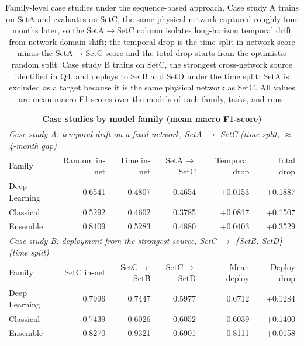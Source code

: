 \begin{table}[htbp]
\caption{Family-level case studies under the sequence-based approach. Case study A trains on SetA and evaluates on SetC, the same physical network captured roughly four months later, so the SetA$\to$SetC column isolates long-horizon temporal drift from network-domain shift; the temporal drop is the time-split in-network score minus the SetA$\to$SetC score and the total drop starts from the optimistic random split. Case study B trains on SetC, the strongest cross-network source identified in Q4, and deploys to SetB and SetD under the time split; SetA is excluded as a target because it is the same physical network as SetC. All values are mean macro F1-scores over the models of each family, tasks, and runs.}
\label{tab:q6_case_studies}
\centering
\small
\begin{tabular}{lrrrrr}
\toprule
\multicolumn{6}{c}{Case studies by model family (mean macro F1-score)} \\
\midrule
\multicolumn{6}{l}{\emph{Case study A: temporal drift on a fixed network, SetA $\rightarrow$ SetC (time split, $\approx$4-month gap)}} \\
\midrule
Family & Random in-net & Time in-net & SetA$\to$SetC & Temporal drop & Total drop \\
\midrule
Deep Learning & 0.6541 & 0.4807 & 0.4654 & +0.0153 & +0.1887 \\
Classical & 0.5292 & 0.4602 & 0.3785 & +0.0817 & +0.1507 \\
Ensemble & 0.8409 & 0.5283 & 0.4880 & +0.0403 & +0.3529 \\
\midrule
\multicolumn{6}{l}{\emph{Case study B: deployment from the strongest source, SetC $\rightarrow$ \{SetB, SetD\} (time split)}} \\
\midrule
Family & SetC in-net & SetC$\to$SetB & SetC$\to$SetD & Mean deploy & Deploy drop \\
\midrule
Deep Learning & 0.7996 & 0.7447 & 0.5977 & 0.6712 & +0.1284 \\
Classical & 0.7439 & 0.6026 & 0.6052 & 0.6039 & +0.1400 \\
Ensemble & 0.8270 & 0.9321 & 0.6901 & 0.8111 & +0.0158 \\
\bottomrule
\end{tabular}
\end{table}
